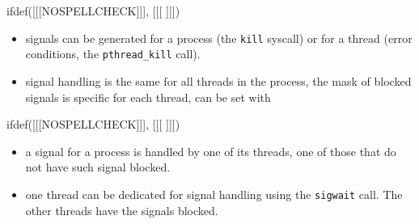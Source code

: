 
ifdef([[[NOSPELLCHECK]]], [[[
]]])

\begin{slide}
\prgchars
\begin{itemize}
\item signals can be generated for a process (the \texttt{kill} syscall) or
for a thread (error conditions, the \texttt{pthread\_kill} call).
\item signal handling is the same for all threads in the process,
the mask of blocked signals is specific for each thread, can be set with
\end{itemize}
ifdef([[[NOSPELLCHECK]]], [[[
]]])
\begin{itemize}
\item a signal for a process is handled by one of its threads, one of those
that do not have such signal blocked.
\item one thread can be dedicated for signal handling using the
\texttt{sigwait} call. The other threads have the signals blocked.
\end{itemize}
\end{slide}


